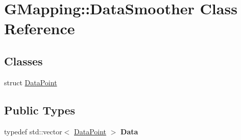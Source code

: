 \hypertarget{classGMapping_1_1DataSmoother}{}\section{G\+Mapping\+:\+:Data\+Smoother Class Reference}
\label{classGMapping_1_1DataSmoother}
\subsection*{Classes}
\begin{DoxyCompactItemize}
\item 
struct \hyperlink{structGMapping_1_1DataSmoother_1_1DataPoint}{Data\+Point}
\end{DoxyCompactItemize}
\subsection*{Public Types}
\begin{DoxyCompactItemize}
\item 
\mbox{\label{classGMapping_1_1DataSmoother_aba2dbbd1e15122f9de8552af63b468b2}} 
typedef std\+::vector$<$ \hyperlink{structGMapping_1_1DataSmoother_1_1DataPoint}{Data\+Point} $>$ {\bfseries Data}
\end{DoxyCompactItemize}
